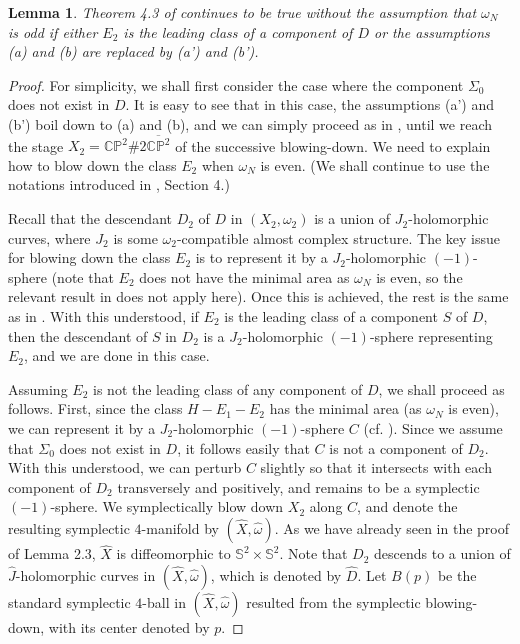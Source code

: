 \documentclass[11pt]{amsart}
\theoremstyle{plain}
\numberwithin{theorem}{section}
\newtheorem{lemma}[theorem]{Lemma}
\theoremstyle{definition}
\newcommand{\C}{{\mathbb C}}
\renewcommand{\P}{{\mathbb P}}
\newcommand{\s}{{\mathbb S}}
\begin{document}
\begin{lemma}
Theorem 4.3 of \cite{C1} continues to be true without the assumption that $\omega_N$ is odd if either
$E_2$ is the leading class of a component of $D$ or the assumptions (a) and (b) are replaced by (a') and (b'). 
\end{lemma}

\begin{proof}
For simplicity, we shall first consider the case where the component $\Sigma_0$ does not exist in $D$. It is easy to see that in this case, the assumptions (a') and (b') boil down to (a) and (b), and we can simply proceed as in \cite{C1}, until we reach the stage $X_2=\C\P^2\# 2\overline{\C\P^2}$ of the successive blowing-down. We need to explain how to blow down the class $E_2$ 
when $\omega_N$ is even. (We shall continue to use the notations introduced in \cite{C1}, 
Section 4.)

Recall that the descendant $D_2$ of $D$ in $(X_2,\omega_2)$ is a union of $J_2$-holomorphic curves, where $J_2$ is some $\omega_2$-compatible almost complex structure. The key issue for blowing down the class $E_2$ is to represent it by a $J_2$-holomorphic $(-1)$-sphere (note that $E_2$ does not have the minimal area as 
$\omega_N$ is even, so the relevant result in \cite{KK} does not apply here). 
Once this is achieved, the rest is the same as in \cite{C1}. With this understood, if $E_2$ is the leading class of a component $S$ of $D$, then the descendant of $S$ in $D_2$ is a $J_2$-holomorphic 
$(-1)$-sphere representing $E_2$, and we are done in this case. 

Assuming $E_2$ is not the leading class of any component of $D$, we shall proceed as follows. First, since the class $H-E_1-E_2$ has the minimal area (as $\omega_N$ is even), we can represent it by a $J_2$-holomorphic 
$(-1)$-sphere $C$ (cf. \cite{KK}). Since we assume that $\Sigma_0$ does not exist in $D$, it follows easily that $C$ is not a component of $D_2$. With this understood, we can perturb $C$ slightly so that it intersects with each component of $D_2$ transversely and positively, and remains to be a symplectic $(-1)$-sphere. We symplectically blow down $X_2$ along $C$, and denote the resulting symplectic $4$-manifold by $(\hat{X},\hat{\omega})$. As we have already seen in the proof of Lemma 2.3, $\hat{X}$ is diffeomorphic to $\s^2\times \s^2$. Note that $D_2$ descends to
a union of $\hat{J}$-holomorphic curves in $(\hat{X},\hat{\omega})$, which is denoted by $\hat{D}$. 
Let $B(p)$ be the standard symplectic $4$-ball in $(\hat{X},\hat{\omega})$ resulted from
the symplectic blowing-down, with its center denoted by $p$.


\end{proof}
\end{document}
